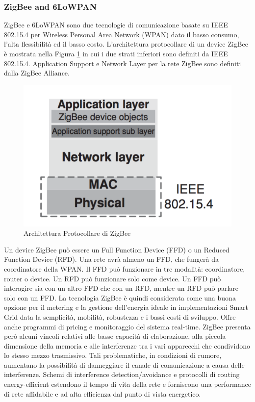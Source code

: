 \subsubsection{ZigBee and 6LoWPAN}
ZigBee e 6LoWPAN sono due tecnologie di comunicazione basate su IEEE 802.15.4 per Wireless Personal Area Network (WPAN) dato il basso consumo, l'alta flessibilità ed il basso costo. L'architettura protocollare di un device ZigBee è mostrata nella Figura \ref{fig:zbprot} in cui i due strati inferiori sono definiti da IEEE 802.15.4. Application Support e Network Layer per la rete ZigBee sono definiti dalla ZigBee Alliance\cite{zb}.
\begin{figure}[h]
	\centering
	\includegraphics[scale=0.350]{imgs/zbprot.png}
	\caption{Architettura Protocollare di ZigBee} \label{fig:zbprot}
\end{figure}
Un device ZigBee può essere un Full Function Device (FFD) o un Reduced Function Device (RFD). Una rete avrà almeno un FFD, che fungerà da coordinatore della WPAN. Il FFD può funzionare in tre modalità: coordinatore, router o device. Un RFD può funzionare solo come device. Un FFD può interagire sia con un altro FFD che con un RFD, mentre un RFD può parlare solo con un FFD.
La tecnologia ZigBee è quindi considerata come una buona opzione per il metering e la gestione dell'energia ideale in implementazioni Smart Grid data la semplicità, mobilità, robustezza e i bassi costi di sviluppo. Offre anche programmi di pricing e monitoraggio del sistema real-time. ZigBee presenta però alcuni vincoli relativi alle basse capacità di elaborazione, alla piccola dimensione della memoria e alle interferenze tra i vari apparecchi che condividono lo stesso mezzo trasmissivo. Tali problematiche, in condizioni di rumore, aumentano la possibilità di danneggiare il canale di comunicazione a causa delle interferenze. Schemi di interference detection/avoidance e protocolli di routing energy-efficient estendono il tempo di vita della rete e forniscono una performance di rete affidabile e ad alta efficienza dal punto di vista energetico.
